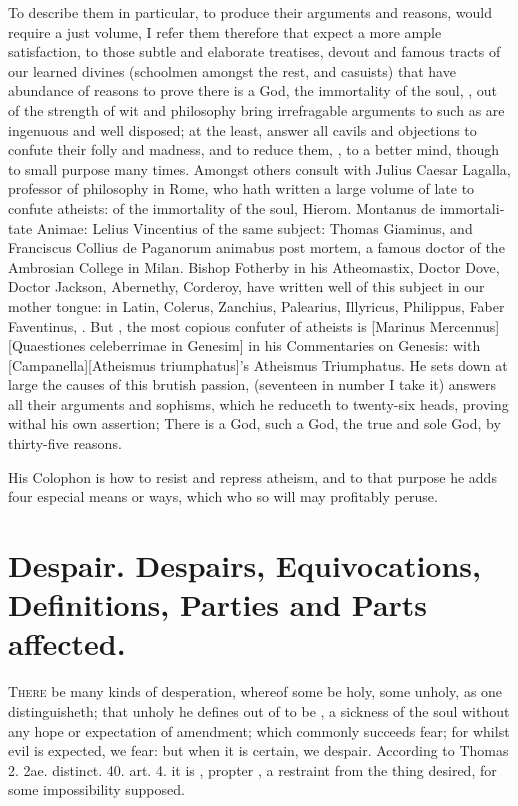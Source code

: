 {To describe them in particular, to produce their arguments and reasons,
would require a just volume, I refer them therefore that expect a more
ample satisfaction, to those subtle and elaborate treatises, devout and
famous tracts of our learned divines (schoolmen amongst the rest, and
casuists) that have abundance of reasons to prove there is a God, the
immortality of the soul, \etc{}, out of the strength of wit and philosophy
bring irrefragable arguments to such as are ingenuous and well
disposed; at the least, answer all cavils and objections to confute
their folly and madness, and to reduce them, , to a better mind, though to small purpose many times. Amongst
others consult with Julius Caesar Lagalla, professor of philosophy in
Rome, who hath written a large volume of late to confute atheists: of
the immortality of the soul, Hierom. Montanus \textlatin{de immortalitate Animae}:
Lelius Vincentius of the same subject: Thomas Giaminus, and Franciscus
Collius \textlatin{de Paganorum animabus post mortem}, a famous doctor of the
Ambrosian College in Milan. Bishop Fotherby in his Atheomastix, Doctor
Dove, Doctor Jackson, Abernethy, Corderoy, have written well of this
subject in our mother tongue: in Latin, Colerus, Zanchius, Palearius,
Illyricus, Philippus, Faber Faventinus, \etc{}. But ,
the most copious confuter of atheists is
[Marinus Mercennus][\textlatin{Quaestiones celeberrimae in Genesim}]
in his Commentaries on Genesis: with [Campanella][\textlatin{Atheismus triumphatus}]'s \textlatin{Atheismus Triumphatus}.
He sets down at large the causes of this brutish passion, (seventeen in
number I take it) answers all their arguments and sophisms, which he
reduceth to twenty-six heads, proving withal his own assertion; There
is a God, such a God, the true and sole God, by thirty-five reasons.

His Colophon is how to resist and repress atheism, and to that purpose
he adds four especial means or ways, which who so will may profitably
peruse.

\section[Despair]{Despair. Despairs, Equivocations, Definitions, Parties and Parts affected.}

\lettrine{T}{here} be many kinds of desperation, whereof some be holy, some unholy,
as one distinguisheth; that unholy he defines out of \Tully to be
, a sickness of
the soul without any hope or expectation of amendment; which commonly
succeeds fear; for whilst evil is expected, we fear: but when it is
certain, we despair. According to Thomas \textlatin{2. 2ae. distinct. 40. art. 4.}
it is , propter , a
restraint from the thing desired, for some impossibility supposed.

}
